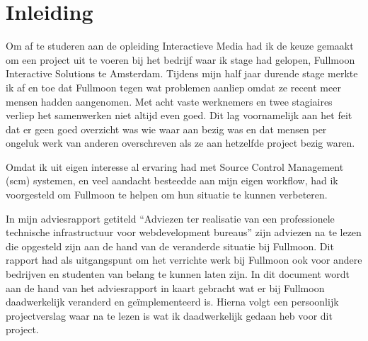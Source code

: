 \chapter{Inleiding}

Om af te studeren aan de opleiding Interactieve Media had ik de keuze gemaakt om een project uit te voeren bij het bedrijf waar ik stage had gelopen, Fullmoon Interactive Solutions te Amsterdam. Tijdens mijn half jaar durende stage merkte ik af en toe dat Fullmoon tegen wat problemen aanliep omdat ze recent meer mensen hadden aangenomen. Met acht vaste werknemers en twee stagiaires verliep het samenwerken niet altijd even goed. Dit lag voornamelijk aan het feit dat er geen goed overzicht was wie waar aan bezig was en dat mensen per ongeluk werk van anderen overschreven als ze aan hetzelfde project bezig waren.

Omdat ik uit eigen interesse al ervaring had met Source Control Management ({\sc scm}) systemen, en veel aandacht besteedde aan mijn eigen workflow, had ik voorgesteld om Fullmoon te helpen om hun situatie te kunnen verbeteren.

In mijn adviesrapport getiteld ``Adviezen ter realisatie van een professionele technische infrastructuur voor webdevelopment bureaus'' zijn adviezen na te lezen die opgesteld zijn aan de hand van de veranderde situatie bij Fullmoon. Dit rapport had als uitgangspunt om het verrichte werk bij Fullmoon ook voor andere bedrijven en studenten van belang te kunnen laten zijn. In dit document wordt aan de hand van het adviesrapport in kaart gebracht wat er bij Fullmoon daadwerkelijk veranderd en geïmplementeerd is. Hierna volgt een persoonlijk projectverslag waar na te lezen is wat ik daadwerkelijk gedaan heb voor dit project.
